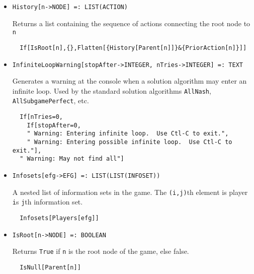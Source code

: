 \begin{itemize}
\item{}
\protect \large \begin{verbatim}
History[n->NODE] =: LIST(ACTION) 
\end{verbatim}\normalsize

\bd 
Returns a list containing the sequence of actions connecting the root
node to \verb+n+
\begin{verbatim}
  If[IsRoot[n],{},Flatten[{History[Parent[n]]}&{PriorAction[n]}]]
\end{verbatim} 
\ed


\item{}
\protect \large \begin{verbatim}
InfiniteLoopWarning[stopAfter->INTEGER, nTries->INTEGER] =: TEXT 
\end{verbatim}\normalsize

\bd 
Generates a warning at the console when a solution algorithm may enter
an infinite loop.  Used by the standard solution algorithms
\verb+AllNash+, \verb+AllSubgamePerfect+, etc.  

\begin{verbatim}
  If[nTries=0,
    If[stopAfter=0,
    " Warning: Entering infinite loop.  Use Ctl-C to exit.",  
    " Warning: Entering possible infinite loop.  Use Ctl-C to exit."],
  " Warning: May not find all"]
\end{verbatim} 
\ed

\item{}
\protect \large \begin{verbatim}
Infosets[efg->EFG] =: LIST(LIST(INFOSET)) 
\end{verbatim}\normalsize

\bd 
A nested list of information sets in the game. The \verb+(i,j)+th
element is player \verb+i+s \verb+j+th information set.  
\begin{verbatim}
  Infosets[Players[efg]]
\end{verbatim} 
\ed

\item{}
\protect \large \begin{verbatim}
IsRoot[n->NODE] =: BOOLEAN 
\end{verbatim}\normalsize

\bd 
Returns \verb+True+ if \verb+n+ is the root node of the game, else
false.  
\begin{verbatim}
  IsNull[Parent[n]]
\end{verbatim} 
\ed


\end{itemize}
